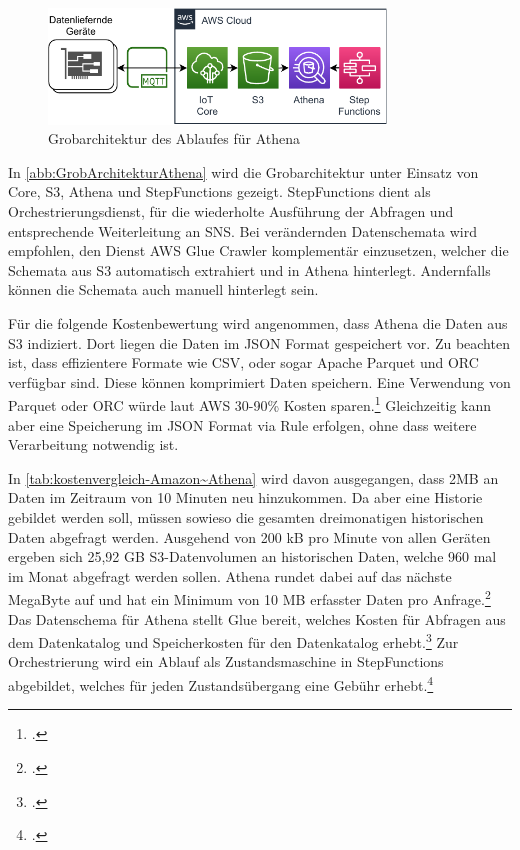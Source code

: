\begin{figure}[H]
\centering
\includegraphics[width=0.8\textwidth]{graphics/Athena-general.pdf}
\caption{Grobarchitektur des Ablaufes für Athena}
\label{abb:GrobArchitekturAthena}
\end{figure}

In \autoref{abb:GrobArchitekturAthena} wird die Grobarchitektur unter Einsatz von \AWSIOT{} Core, \ac{S3}, Athena und StepFunctions gezeigt. StepFunctions dient als Orchestrierungsdienst, für die wiederholte Ausführung der Abfragen und entsprechende Weiterleitung an \ac{SNS}.
Bei verändernden Datenschemata wird empfohlen, den Dienst \ac{AWS} Glue Crawler komplementär einzusetzen, welcher die Schemata aus \ac{S3} automatisch extrahiert und in Athena hinterlegt. Andernfalls können die Schemata auch manuell hinterlegt sein.


Für die folgende Kostenbewertung wird angenommen, dass Athena die Daten aus \ac{S3} indiziert. Dort liegen die Daten im \ac{JSON} Format gespeichert vor. Zu beachten ist, dass effizientere Formate wie CSV, oder sogar Apache Parquet und ORC verfügbar sind. Diese können komprimiert Daten speichern. Eine Verwendung von Parquet oder ORC würde laut \ac{AWS} 30-90\% Kosten sparen.\footcite[Vgl.][]{AmazonWebServicesInc..o.J.t} Gleichzeitig kann aber eine Speicherung im \ac{JSON} Format via \AWSIOT{} Rule erfolgen, ohne dass weitere Verarbeitung notwendig ist.

In \autoref{tab:kostenvergleich-Amazon~Athena} wird davon ausgegangen, dass 2MB an Daten im Zeitraum von 10 Minuten neu hinzukommen. Da aber eine Historie gebildet werden soll, müssen sowieso die gesamten dreimonatigen historischen Daten abgefragt werden. Ausgehend von 200 kB pro Minute von allen Geräten ergeben sich 25,92 GB \ac{S3}-Datenvolumen an historischen Daten, welche 960 mal im Monat abgefragt werden sollen. Athena rundet dabei auf das nächste MegaByte auf und hat ein Minimum von 10 MB erfasster Daten pro Anfrage.\footcite[Vgl.][]{AmazonWebServicesInc..o.J.t} Das Datenschema für Athena stellt Glue bereit, welches Kosten für Abfragen aus dem Datenkatalog und Speicherkosten für den Datenkatalog erhebt.\footcite[Vgl.][]{AmazonWebServicesInc..o.J.u} Zur Orchestrierung wird ein Ablauf als Zustandsmaschine in StepFunctions abgebildet, welches für jeden Zustandsübergang eine Gebühr erhebt.\footcite[Vgl.][]{AmazonWebServicesInc..o.J.v}

